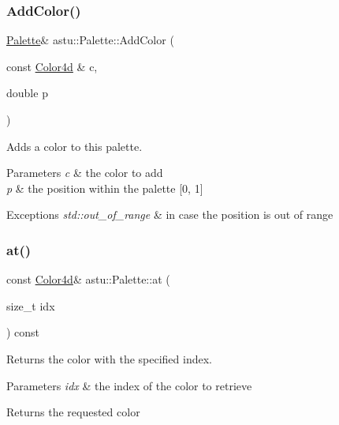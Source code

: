 \subsubsection{\texorpdfstring{Add\+Color()}{AddColor()}}
{\footnotesize\ttfamily \hyperlink{classastu_1_1Palette}{Palette}\& astu\+::\+Palette\+::\+Add\+Color (\begin{DoxyParamCaption}\item[{const \hyperlink{classastu_1_1Color}{Color4d} \&}]{c,  }\item[{double}]{p }\end{DoxyParamCaption})}

Adds a color to this palette.


\begin{DoxyParams}{Parameters}
{\em c} & the color to add \\
\hline
{\em p} & the position within the palette \mbox{[}0, 1\mbox{]} \\
\hline
\end{DoxyParams}

\begin{DoxyExceptions}{Exceptions}
{\em std\+::out\+\_\+of\+\_\+range} & in case the position is out of range \\
\hline
\end{DoxyExceptions}
\mbox{\label{classastu_1_1Palette_a5cf0b8043184527e3a7ead5c03f1f741}} 
\subsubsection{\texorpdfstring{at()}{at()}}
{\footnotesize\ttfamily const \hyperlink{classastu_1_1Color}{Color4d}\& astu\+::\+Palette\+::at (\begin{DoxyParamCaption}\item[{size\+\_\+t}]{idx }\end{DoxyParamCaption}) const}

Returns the color with the specified index.


\begin{DoxyParams}{Parameters}
{\em idx} & the index of the color to retrieve \\
\hline
\end{DoxyParams}
\begin{DoxyReturn}{Returns}
the requested color 
\end{DoxyReturn}

